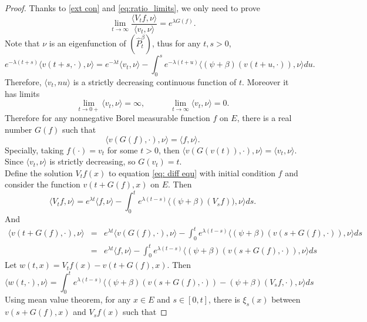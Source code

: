 \documentclass[12pt,a4paper]{amsart}
\numberwithin{equation}{section}
\theoremstyle{plain}
\theoremstyle{definition}
\begin{document}
\begin{proof}
	Thanks to \eqref{ext con} and \eqref{eq:ratio_limits}, we only need to prove
  \begin{equation}\label{eq:spec_ratio}
    \lim_{t\rightarrow\infty}\frac{\langle V_tf,\nu\rangle }{\langle v_t,\nu\rangle }=e^{\lambda G(f)}.
  \end{equation}
	Note that $\nu$ is an eigenfunction of {\color{red}$(\widehat P^\beta_t)$}, thus for any $t,s>0$,
  \begin{equation}\label{eq:monotone}
    e^{-\lambda(t+s)}\langle v(t+s,\cdot),\nu\rangle =e^{-\lambda t}\langle v_t,\nu\rangle -\int_0^se^{-\lambda(t+u)}\langle (\psi+\beta)(v(t+u,\cdot)),\nu\rangle du.
  \end{equation}
 	Therefore, $\langle v_t,nu\rangle $ is a strictly decreasing continuous function of $t$.  Moreover it has limits
  \[
    \lim_{t\rightarrow 0+}\langle v_t,\nu\rangle =\infty,\qquad\quad \lim_{t\rightarrow\infty}\langle v_t,\nu\rangle =0.
  \]
	Therefore for any nonnegative Borel measurable function $f$ on $E$, there is a real number $G(f)$ such that
  \begin{equation}\label{eq:def_of_G}
    \langle v(G(f),\cdot),\nu\rangle =\langle f,\nu\rangle .
  \end{equation}
	Specially, taking $f(\cdot)=v_t$ for some $t>0$, then $\langle v(G(v(t)),\cdot),\nu\rangle =\langle v_t,\nu\rangle $.
	Since  $\langle v_t,\nu\rangle $ is strictly decreasing, so $G(v_t)=t$.\\
	Define the solution $V_tf(x)$ to equation \eqref{eq: diff equ} with initial condition $f$ and consider the function $v(t+G(f),x)$ on $E$. Then
  \[
    \langle V_tf,\nu\rangle =e^{\lambda t}\langle f,\nu\rangle -\int_0^te^{\lambda(t-s)}\langle (\psi+\beta)(V_sf)),\nu\rangle ds.
  \]
	And
  \begin{eqnarray*}
    \langle v(t+G(f),\cdot),\nu\rangle &=&e^{\lambda t}\langle v(G(f),\cdot),\nu\rangle -\int_0^te^{\lambda(t-s)}\langle (\psi+\beta)(v(s+G(f),\cdot)),\nu\rangle ds\\
                                       &=&e^{\lambda t}\langle f,\nu\rangle -\int_0^te^{\lambda (t-s)}\langle (\psi+\beta)(v(s+G(f),\cdot)),\nu\rangle ds
  \end{eqnarray*}
	Let $w(t,x)=V_tf(x)-v(t+G(f),x)$. Then
  \[
    \langle w(t,\cdot),\nu\rangle =\int_0^te^{\lambda(t-s)}\langle (\psi+\beta)(v(s+G(f),\cdot))-(\psi+\beta)(V_sf,\cdot),\nu\rangle ds
  \]
	Using mean value theorem, for any $x\in E$ and $s\in [0,t]$, there is $\xi_s(x)$ between $v(s+G(f),x)$ and $V_sf(x)$ such that

\end{proof}
\end{document}
